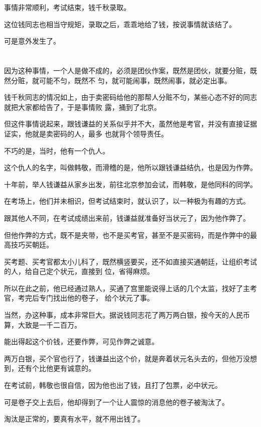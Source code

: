\documentclass[11pt,a4paper,onecolumn]{article}
\begin{document}
事情非常顺利，考试结束，钱千秋录取。

这位钱同志也相当守规矩，录取之后，乖乖地给了钱，按说事情就该结了。

可是意外发生了。

\section[\thesection]{}

因为这种事情，一个人是做不成的，必须是团伙作案，既然是团伙，就要分赃，既然分赃，就可能不匀，既然不
匀，就可能闹事，既然闹事，就必定出事。

钱千秋同志的情况如上，由于卖密码给他的那帮人分赃不匀，某些心态不好的同志就把大家都给告了，于是事情败
露，捅到了北京。

但这件事情说起来，跟钱谦益的关系似乎并不大，虽然他是考官，并没有直接证据证实，他就是卖密码的人，最多
也就背个领导责任。

不巧的是，当时，他有一个仇人。

这个仇人的名字，叫做韩敬，而滑稽的是，他所以跟钱谦益结仇，也是因为作弊。

十年前，举人钱谦益从家乡出发，前往北京参加会试，而韩敬，是他同科的同学。

在考场上，他们并未相识，但考试结束时，就认识了，以一种极为有趣的方式。

跟其他人不同，在考试成绩出来前，钱谦益就准备好当状元了，因为他作弊了。

但他作弊的方式，既不是夹带，也不是买考官，甚至不是买密码，而是作弊中的最高技巧\myrule 买朝廷。

买考题、买考官都太小儿科了，既然横竖要买，还不如直接买通朝廷，让组织考试的人，给自己定个状元，直接到
位，省得麻烦。

所以在此之前，他已经通过熟人，买通了宫里能说得上话的几个太监，找好了主考官，考完后专门找出他的卷子，
给个状元了事。

当然，办这种事，成本非常巨大。据说钱同志花了两万两白银，按今天的人民币算，大致是一千二百万。

能出得起这个价钱，还要作弊，可见作弊之诚意。

两万白银，买个官也行了，钱谦益出这个价，就是奔着状元名头去的，但他万没想到，还有个比他更有诚意的。

在考试前，韩敬也很自信，因为他也出了钱，且打了包票，必中状元。

可是卷子交上去后，他却得到了一个让人震惊的消息\myrule 他的卷子被淘汰了。

淘汰是正常的，要真有水平，就不用出钱了。
\end{document}
